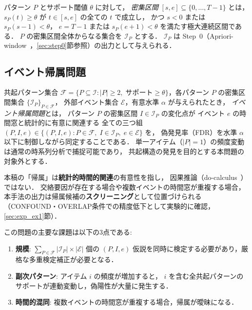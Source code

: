 \begin{definition}[密集区間]\label{def:dense_interval}
パターン $P$ とサポート閾値 $\theta$ に対して，
\emph{密集区間} $[s, e] \subseteq \{0, \ldots, T-1\}$ とは，
$s_P(t) \geq \theta$ が $t \in [s, e]$ の全ての $t$ で成立し，
かつ $s < 0$ または $s_P(s-1) < \theta$，
$e = T-1$ または $s_P(e+1) < \theta$ を満たす極大連続区間である．
$P$ の密集区間全体からなる集合を $\mathcal{I}_P$ とする．
$\mathcal{I}_P$ は Step~0（Apriori-window~\cite{dsaa2025}，\ref{sec:step0}節参照）の出力として与えられる．
\end{definition}

\subsection{イベント帰属問題}

\begin{definition}[イベント帰属問題]\label{def:attribution}
共起パターン集合 $\mathcal{F} = \{P \subseteq \mathcal{I} : |P| \geq 2,\;
\text{サポート} \geq \theta\}$，各パターン $P$ の密集区間集合 $\{\mathcal{I}_P\}_{P \in \mathcal{F}}$，
外部イベント集合 $\mathcal{E}$，有意水準 $\alpha$ が与えられたとき，
\emph{イベント帰属問題}とは，
パターン $P$ の密集区間 $I \in \mathcal{I}_P$ の変化点が
イベント $e$ の時間窓と統計的に有意に関連する
全ての三つ組 $(P, I, e) \in \{(P, I, e) : P \in \mathcal{F},\; I \in \mathcal{I}_P,\; e \in \mathcal{E}\}$ を，
偽発見率（FDR）を水準 $\alpha$ 以下に制御しながら同定することである．
単一アイテム（$|P| = 1$）の頻度変動は通常の時系列分析で捕捉可能であり，
共起構造の発見を目的とする本問題の対象外とする．
\end{definition}

\begin{remark}[帰属の意味と限界]\label{rem:attribution_scope}
本稿の「帰属」は\textbf{統計的時間的関連}の有意性を指し，
因果推論（do-calculus~\cite{pearl2009causality}）ではない．
交絡要因が存在する場合や複数イベントの時間窓が重複する場合，
本手法の出力は帰属候補の\textbf{スクリーニング}として位置づけられる
（CONFOUND・OVERLAP条件での精度低下として実験的に確認，\ref{sec:exp_ex1}節）．
\end{remark}

この問題の主要な課題は以下の3点である:

\begin{enumerate}
\item \textbf{規模}: $\sum_{P \in \mathcal{F}} |\mathcal{I}_P| \times |\mathcal{E}|$ 個の
$(P, I, e)$ 仮説を同時に検定する必要があり，厳格な多重検定補正が必要となる．

\item \textbf{副次パターン}: アイテム $i$ の頻度が増加すると，
$i$ を含む全共起パターンのサポートが連動変動し，偽陽性が大量に発生する．

\item \textbf{時間的混同}: 複数イベントの時間窓が重複する場合，帰属が曖昧になる．
\end{enumerate}
